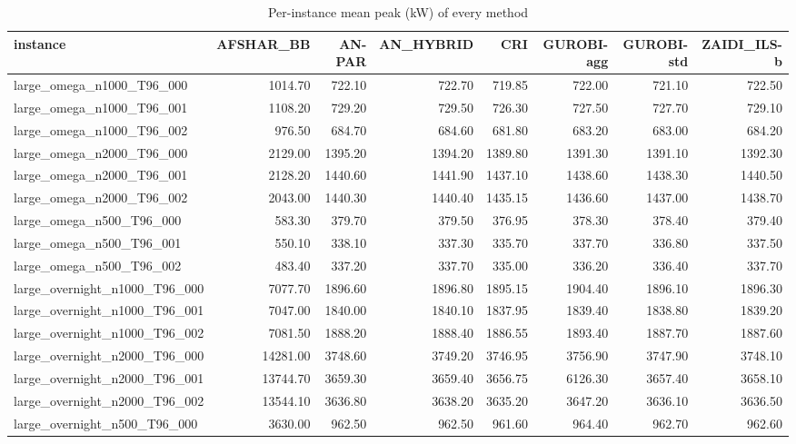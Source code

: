 \begin{table}[htbp]
\centering
\small
\caption{Per-instance mean peak (kW) of every method}
\label{tab:E10b_state_of_the_art_60s_b60_per_instance}
\begin{tabular}{lrrrrrrr}
\toprule
instance & AFSHAR\_BB & AN-PAR & AN\_HYBRID & CRI & GUROBI-agg & GUROBI-std & ZAIDI\_ILS-b \\
\midrule
large\_omega\_n1000\_T96\_000 & 1014.70 & 722.10 & 722.70 & 719.85 & 722.00 & 721.10 & 722.50 \\
large\_omega\_n1000\_T96\_001 & 1108.20 & 729.20 & 729.50 & 726.30 & 727.50 & 727.70 & 729.10 \\
large\_omega\_n1000\_T96\_002 & 976.50 & 684.70 & 684.60 & 681.80 & 683.20 & 683.00 & 684.20 \\
large\_omega\_n2000\_T96\_000 & 2129.00 & 1395.20 & 1394.20 & 1389.80 & 1391.30 & 1391.10 & 1392.30 \\
large\_omega\_n2000\_T96\_001 & 2128.20 & 1440.60 & 1441.90 & 1437.10 & 1438.60 & 1438.30 & 1440.50 \\
large\_omega\_n2000\_T96\_002 & 2043.00 & 1440.30 & 1440.40 & 1435.15 & 1436.60 & 1437.00 & 1438.70 \\
large\_omega\_n500\_T96\_000 & 583.30 & 379.70 & 379.50 & 376.95 & 378.30 & 378.40 & 379.40 \\
large\_omega\_n500\_T96\_001 & 550.10 & 338.10 & 337.30 & 335.70 & 337.70 & 336.80 & 337.50 \\
large\_omega\_n500\_T96\_002 & 483.40 & 337.20 & 337.70 & 335.00 & 336.20 & 336.40 & 337.70 \\
large\_overnight\_n1000\_T96\_000 & 7077.70 & 1896.60 & 1896.80 & 1895.15 & 1904.40 & 1896.10 & 1896.30 \\
large\_overnight\_n1000\_T96\_001 & 7047.00 & 1840.00 & 1840.10 & 1837.95 & 1839.40 & 1838.80 & 1839.20 \\
large\_overnight\_n1000\_T96\_002 & 7081.50 & 1888.20 & 1888.40 & 1886.55 & 1893.40 & 1887.70 & 1887.60 \\
large\_overnight\_n2000\_T96\_000 & 14281.00 & 3748.60 & 3749.20 & 3746.95 & 3756.90 & 3747.90 & 3748.10 \\
large\_overnight\_n2000\_T96\_001 & 13744.70 & 3659.30 & 3659.40 & 3656.75 & 6126.30 & 3657.40 & 3658.10 \\
large\_overnight\_n2000\_T96\_002 & 13544.10 & 3636.80 & 3638.20 & 3635.20 & 3647.20 & 3636.10 & 3636.50 \\
large\_overnight\_n500\_T96\_000 & 3630.00 & 962.50 & 962.50 & 961.60 & 964.40 & 962.70 & 962.60 \\

\end{tabular}
\end{table}
